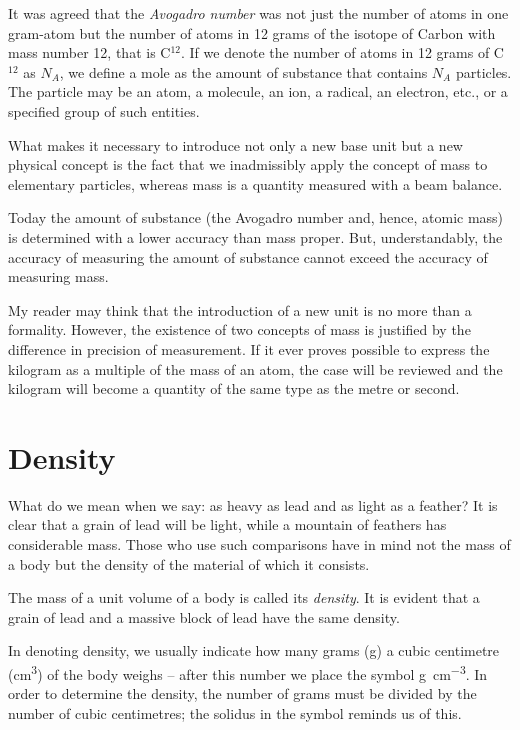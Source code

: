 It was agreed that the \emph{Avogadro number} was not just the number of
atoms in one gram-atom but the number of atoms in 12 grams of the
isotope of Carbon with mass number 12, that is C$^{12}$. If we denote the
number of atoms in 12 grams of C$^{12}$ as $N_{A}$, we define a mole as the
amount of substance that contains $N_{A}$ particles. The particle may be
an atom, a molecule, an ion, a radical, an electron, etc., or a
specified group of such entities.  

What makes it necessary to introduce not only a new base unit but a
new physical concept is the fact that we inadmissibly apply the
concept of mass to elementary particles, whereas mass is a quantity
measured with a beam balance.  

Today the amount of substance (the Avogadro number and, hence, atomic
mass) is determined with a lower accuracy than mass proper. But,
understandably, the accuracy of measuring the amount of substance
cannot exceed the accuracy of measuring mass.

My reader may think that the introduction of a new
unit is no more than a formality. However, the existence of two
concepts of mass is justified by the difference in precision of
measurement. If it ever proves possible to express the kilogram as a
multiple of the mass of an atom, the case will be reviewed and the
kilogram will become a quantity of the same type as the metre or
second.  

\section{Density}

What do we mean when we say: as heavy as lead and as light as a
feather? It is clear that a grain of lead will be light, while a
mountain of feathers has considerable mass. Those who use such
comparisons have in mind not the mass of a body but
the density of the material of which it consists.  

The mass of a unit volume of a body is called its \emph{density}. It
is evident that a grain of lead and a massive block of lead have the
same density.  

In denoting density, we usually indicate how many grams (\si{\gram}) a
cubic centimetre (\si{\cm^{3}}) of the body weighs -- after this
number we place the symbol \si{\gram\per\cm^{3}}. In order to
determine the density, the number of grams must be divided by the
number of cubic centimetres; the solidus in the symbol reminds us of
this.

